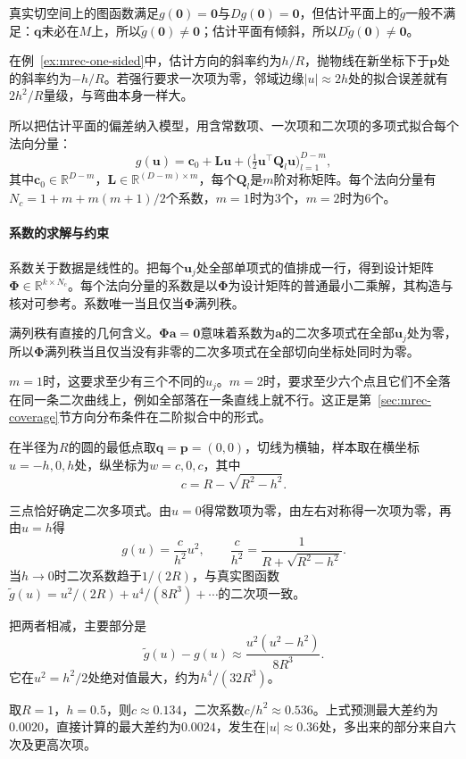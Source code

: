 真实切空间上的图函数满足$g(\bm0)=\bm0$与$Dg(\bm0)=\bm0$，但估计平面上的$\widetilde g$一般不满足：$\bm q$未必在$M$上，所以$\widetilde g(\bm0)\neq\bm0$；估计平面有倾斜，所以$D\widetilde g(\bm0)\neq\bm0$。

在例~\ref{ex:mrec-one-sided}中，估计方向的斜率约为$h/R$，抛物线在新坐标下于$\bm p$处的斜率约为$-h/R$。若强行要求一次项为零，邻域边缘$\lvert u\rvert\approx2h$处的拟合误差就有$2h^2/R$量级，与弯曲本身一样大。

所以把估计平面的偏差纳入模型，用含常数项、一次项和二次项的多项式拟合每个法向分量：
\begin{equation}
 g(\bm u)=\bm c_0+\bm L\bm u+\bigl(\tfrac12\bm u^\top\bm Q_l\bm u\bigr)_{l=1}^{D-m},
 \label{eq:mrec-quadratic-model}
\end{equation}
其中$\bm c_0\in\mathbb R^{D-m}$，$\bm L\in\mathbb R^{(D-m)\times m}$，每个$\bm Q_l$是$m$阶对称矩阵。每个法向分量有$N_c=1+m+m(m+1)/2$个系数，$m=1$时为$3$个，$m=2$时为$6$个。

\paragraph{系数的求解与约束}

系数关于数据是线性的。把每个$\bm u_j$处全部单项式的值排成一行，得到设计矩阵$\bm\Phi\in\mathbb R^{k\times N_c}$。每个法向分量的系数是以$\bm\Phi$为设计矩阵的普通最小二乘解，其构造与核对可参考。系数唯一当且仅当$\bm\Phi$满列秩。

满列秩有直接的几何含义。$\bm\Phi\bm a=\bm0$意味着系数为$\bm a$的二次多项式在全部$\bm u_j$处为零，所以$\bm\Phi$满列秩当且仅当没有非零的二次多项式在全部切向坐标处同时为零。

$m=1$时，这要求至少有三个不同的$u_j$。$m=2$时，要求至少六个点且它们不全落在同一条二次曲线上，例如全部落在一条直线上就不行。这正是第~\ref{sec:mrec-coverage}节方向分布条件在二阶拟合中的形式。

\begin{example}[圆弧上的二次拟合]
\label{ex:mrec-circle-fit}
在半径为$R$的圆的最低点取$\bm q=\bm p=(0,0)$，切线为横轴，样本取在横坐标$u=-h,0,h$处，纵坐标为$w=c,0,c$，其中
\[
 c=R-\sqrt{R^2-h^2}.
\]

三点恰好确定二次多项式。由$u=0$得常数项为零，由左右对称得一次项为零，再由$u=h$得
\[
 g(u)=\frac c{h^2}u^2,\qquad\frac c{h^2}=\frac1{R+\sqrt{R^2-h^2}}.
\]
当$h\to0$时二次系数趋于$1/(2R)$，与真实图函数$\widetilde g(u)=u^2/(2R)+u^4/(8R^3)+\cdots$的二次项一致。

把两者相减，主要部分是
\[
 \widetilde g(u)-g(u)\approx\frac{u^2(u^2-h^2)}{8R^3}.
\]
它在$u^2=h^2/2$处绝对值最大，约为$h^4/(32R^3)$。

取$R=1$，$h=0.5$，则$c\approx0.134$，二次系数$c/h^2\approx0.536$。上式预测最大差约为$0.0020$，直接计算的最大差约为$0.0024$，发生在$\lvert u\rvert\approx0.36$处，多出来的部分来自六次及更高次项。
\end{example}

